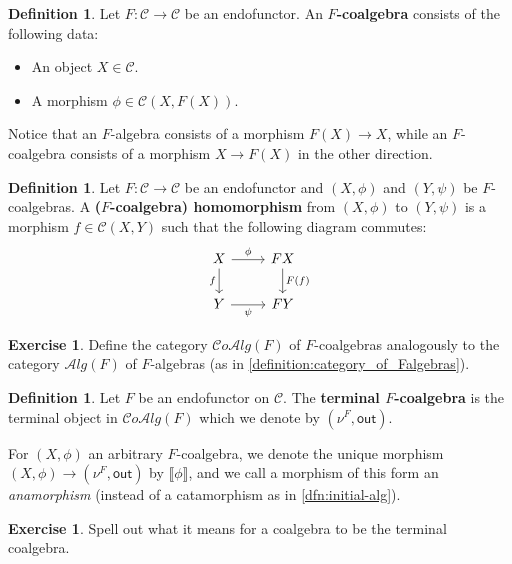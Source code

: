 \documentclass[a4paper,11pt, oneside,titlepage=false]{scrbook}
\theoremstyle{plain}
\theoremstyle{definition}
\newtheorem{dfn}[thm]{Definition}
\newtheorem{exer}[thm]{Exercise}
\newcommand{\Cat}[1]{\mathcal{#1}}
\newcommand{\CC}{\Cat{C}}
\newcommand{\ALG}[1]{\Cat{A}lg(#1)}
\newcommand{\COALG}[1]{\Cat{C}o\Cat{A}lg(#1)}
\newcommand{\CHom}[3]{{#1}(#2,#3)}
\newcommand{\Terminalcoalg}[1]{\ensuremath{\nu^{#1}}}
\newcommand{\anam}[1]{\llbracket #1 \rrbracket} %
\newcommand{\Out}{\ensuremath{\mathsf{out}}}
\begin{document}
\begin{dfn} Let $F:\CC\to \CC$ be an endofunctor. An \textbf{$F$-coalgebra} consists of the following data:
\begin{itemize}
\item An object $X\in \CC$.
\item A morphism $\phi \in \CHom{\CC}{X}{F(X)}$.
\end{itemize}
\end{dfn}
Notice that an $F$-algebra consists of a morphism $F(X)\to X$, while an $F$-coalgebra consists of a morphism $X\to F(X)$ in the other direction.

\begin{dfn} Let $F:\CC\to \CC$ be an endofunctor and $(X,\phi)$ and $(Y,\psi)$ be $F$-coalgebras. A \textbf{($F$-coalgebra) homomorphism} from $(X,\phi)$ to $(Y,\psi)$ is a morphism $f\in \CHom{\CC}{X}{Y}$ such that the following diagram commutes:
\[
\begin{tikzcd}
X
\arrow[r, "\phi"]
\arrow[d,swap, "f"]
& FX
\arrow[d, "F(f)"]
\\
Y
\arrow[r, swap, "\psi"]
& FY
\end{tikzcd}
\]
\end{dfn}

\begin{exer} Define the category $\COALG{F}$ of $F$-coalgebras analogously to the category $\ALG{F}$ of $F$-algebras (as in \cref{definition:category_of_Falgebras}).
\end{exer}

\begin{dfn} Let $F$ be an endofunctor on $\CC$. The \textbf{terminal $F$-coalgebra} is the terminal object in $\COALG{F}$ which we denote by $(\Terminalcoalg{F}, \Out)$.

For $(X,\phi)$ an arbitrary $F$-coalgebra, we denote the unique morphism $(X,\phi) \to (\Terminalcoalg{F}, \Out)$ by $\anam{\phi}$, and we call a morphism of this form an \textit{anamorphism} (instead of a catamorphism as in \cref{dfn:initial-alg}).
\end{dfn}

\begin{exer} Spell out what it means for a coalgebra to be the terminal coalgebra.
\end{exer}
\end{document}
